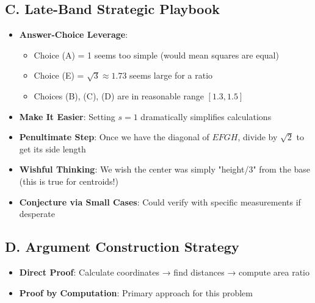 \documentclass[]{article}
\begin{document}
\begin{strategicbox}
\subsection*{C. Late-Band Strategic Playbook}
\begin{itemize}[leftmargin=*]
    \item \textbf{Answer-Choice Leverage}: 
    \begin{itemize}
        \item Choice (A) = 1 seems too simple (would mean squares are equal)
        \item Choice (E) = $\sqrt{3} \approx 1.73$ seems large for a ratio
        \item Choices (B), (C), (D) are in reasonable range $[1.3, 1.5]$
    \end{itemize}
    \item \textbf{Make It Easier}: Setting $s=1$ dramatically simplifies calculations
    \item \textbf{Penultimate Step}: Once we have the diagonal of $EFGH$, divide by $\sqrt{2}$ to get its side length
    \item \textbf{Wishful Thinking}: We wish the center was simply "height/3" from the base (this is true for centroids!)
    \item \textbf{Conjecture via Small Cases}: Could verify with specific measurements if desperate
\end{itemize}

\subsection*{D. Argument Construction Strategy}
\begin{itemize}[leftmargin=*]
    \item \textbf{Direct Proof}: Calculate coordinates → find distances → compute area ratio
    \item \textbf{Proof by Computation}: Primary approach for this problem
\end{itemize}
\end{strategicbox}
\end{document}
